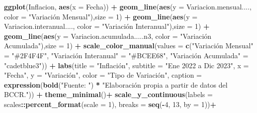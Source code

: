 \documentclass[
]{article}
\newenvironment{Shaded}{\begin{snugshade}}{\end{snugshade}}
\newcommand{\AttributeTok}[1]{\textcolor[rgb]{0.13,0.29,0.53}{#1}}
\newcommand{\DecValTok}[1]{\textcolor[rgb]{0.00,0.00,0.81}{#1}}
\newcommand{\FunctionTok}[1]{\textcolor[rgb]{0.13,0.29,0.53}{\textbf{#1}}}
\newcommand{\NormalTok}[1]{#1}
\newcommand{\OtherTok}[1]{\textcolor[rgb]{0.56,0.35,0.01}{#1}}
\newcommand{\SpecialCharTok}[1]{\textcolor[rgb]{0.81,0.36,0.00}{\textbf{#1}}}
\newcommand{\StringTok}[1]{\textcolor[rgb]{0.31,0.60,0.02}{#1}}
\begin{document}
\begin{Shaded}
\begin{Highlighting}[]
\FunctionTok{ggplot}\NormalTok{(Inflacion, }\FunctionTok{aes}\NormalTok{(}\AttributeTok{x =}\NormalTok{ Fecha)) }\SpecialCharTok{+}
  \FunctionTok{geom\_line}\NormalTok{(}\FunctionTok{aes}\NormalTok{(}\AttributeTok{y =} \StringTok{\textasciigrave{}}\AttributeTok{Variacion.mensual....}\StringTok{\textasciigrave{}}\NormalTok{, }\AttributeTok{color =} \StringTok{"Variación Mensual"}\NormalTok{),}\AttributeTok{size =} \DecValTok{1}\NormalTok{) }\SpecialCharTok{+}
  \FunctionTok{geom\_line}\NormalTok{(}\FunctionTok{aes}\NormalTok{(}\AttributeTok{y =} \StringTok{\textasciigrave{}}\AttributeTok{Variacion.interanual....}\StringTok{\textasciigrave{}}\NormalTok{, }\AttributeTok{color =} \StringTok{"Variación Interanual"}\NormalTok{),}\AttributeTok{size =} \DecValTok{1}\NormalTok{) }\SpecialCharTok{+}
  \FunctionTok{geom\_line}\NormalTok{(}\FunctionTok{aes}\NormalTok{(}\AttributeTok{y =} \StringTok{\textasciigrave{}}\AttributeTok{Variacion.acumulada.....n3}\StringTok{\textasciigrave{}}\NormalTok{, }\AttributeTok{color =} \StringTok{"Variación Acumulada"}\NormalTok{),}\AttributeTok{size =} \DecValTok{1}\NormalTok{) }\SpecialCharTok{+}
  \FunctionTok{scale\_color\_manual}\NormalTok{(}\AttributeTok{values =} \FunctionTok{c}\NormalTok{(}\StringTok{"Variación Mensual"} \OtherTok{=} \StringTok{"\#2F4F4F"}\NormalTok{, }\StringTok{"Variación Interanual"} \OtherTok{=} \StringTok{"\#BCEE68"}\NormalTok{, }\StringTok{"Variación Acumulada"} \OtherTok{=} \StringTok{"cadetblue3"}\NormalTok{)) }\SpecialCharTok{+}
  \FunctionTok{labs}\NormalTok{(}\AttributeTok{title =} \StringTok{"Inflación"}\NormalTok{,}
       \AttributeTok{subtitle =} \StringTok{"Ene 2022 a Dic 2023"}\NormalTok{,}
       \AttributeTok{x =} \StringTok{"Fecha"}\NormalTok{,}
       \AttributeTok{y =} \StringTok{"Variación"}\NormalTok{,}
       \AttributeTok{color =} \StringTok{"Tipo de Variación"}\NormalTok{,}
       \AttributeTok{caption =} \FunctionTok{expression}\NormalTok{(}\FunctionTok{bold}\NormalTok{(}\StringTok{"Fuente: "}\NormalTok{) }\SpecialCharTok{*} \StringTok{"Elaboración propia a partir de datos del BCCR."}\NormalTok{)) }\SpecialCharTok{+}
  \FunctionTok{theme\_minimal}\NormalTok{()}\SpecialCharTok{+}
  \FunctionTok{scale\_y\_continuous}\NormalTok{(}\AttributeTok{labels =}\NormalTok{ scales}\SpecialCharTok{::}\FunctionTok{percent\_format}\NormalTok{(}\AttributeTok{scale =} \DecValTok{1}\NormalTok{), }\AttributeTok{breaks =} \FunctionTok{seq}\NormalTok{(}\SpecialCharTok{{-}}\DecValTok{4}\NormalTok{, }\DecValTok{13}\NormalTok{, }\AttributeTok{by =} \DecValTok{1}\NormalTok{))}\SpecialCharTok{+}

\end{Highlighting}
\end{Shaded}
\end{document}
